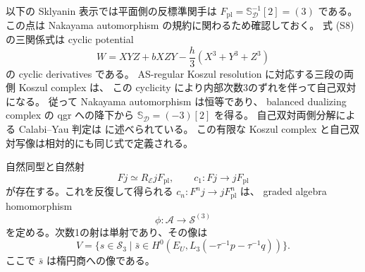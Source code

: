 以下の Sklyanin 表示では平面側の反標準関手は
$F_{\mathrm{pl}}=\mathbb S_{\mathcal D}^{-1}[2]=(3)$ である。
この点は Nakayama automorphism の規約に関わるため確認しておく。
式 (S8) の三関係式は cyclic potential
\[
       W=XYZ+bXZY-\frac h3(X^3+Y^3+Z^3)
\]
の cyclic derivatives である。
AS-regular Koszul resolution に対応する三段の両側 Koszul complex は、
この cyclicity により内部次数3のずれを伴って自己双対になる。
従って Nakayama automorphism は恒等であり、
balanced dualizing complex の qgr への降下から
$\mathbb S_{\mathcal D}=(-3)[2]$ を得る。
自己双対両側分解による Calabi--Yau 判定は
\cite[定理4.2--4.3]{ACBocklandt} に述べられている。
この有限な Koszul complex と自己双対写像は相対的にも同じ式で定義される。

\begin{lemma}\label{lem:ac-mutation-map}
自然同型と自然射
\[
 F j\simeq R_{\mathcal E}jF_{\mathrm{pl}},\qquad
 c_1\colon Fj\longrightarrow jF_{\mathrm{pl}}
\]
が存在する。これを反復して得られる $c_n\colon F^nj\to jF_{\mathrm{pl}}^n$ は、
graded algebra homomorphism
\begin{equation}\label{eq:ac-plane-homomorphism}
                 \phi\colon\mathscr A\longrightarrow\mathcal S^{(3)}
\end{equation}
を定める。次数1の射は単射であり、その像は
\begin{equation}\label{eq:ac-degree-one-subspace}
 V=\bigl\{s\in\mathcal S_3\mid
     \bar s\in H^0(E_U,L_3(-\tau^{-1}p-\tau^{-1}q))\bigr\}.
\end{equation}
ここで $\bar s$ は楕円商への像である。
\end{lemma}


